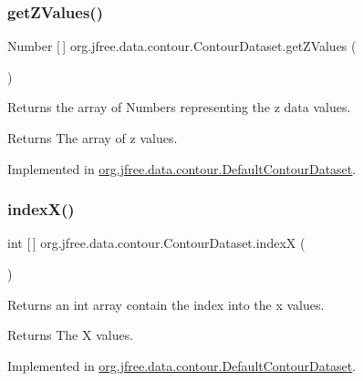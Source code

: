 \subsubsection{\texorpdfstring{get\+Z\+Values()}{getZValues()}}
{\footnotesize\ttfamily Number \mbox{[}$\,$\mbox{]} org.\+jfree.\+data.\+contour.\+Contour\+Dataset.\+get\+Z\+Values (\begin{DoxyParamCaption}{ }\end{DoxyParamCaption})}

Returns the array of Numbers representing the z data values.

\begin{DoxyReturn}{Returns}
The array of z values. 
\end{DoxyReturn}


Implemented in \mbox{\hyperlink{classorg_1_1jfree_1_1data_1_1contour_1_1_default_contour_dataset_aeab7352c99dfe7e6ebff00064e8d7ce0}{org.\+jfree.\+data.\+contour.\+Default\+Contour\+Dataset}}.

\mbox{\label{interfaceorg_1_1jfree_1_1data_1_1contour_1_1_contour_dataset_ae70cc41ec60ec5aea6aae21d9d868b1f}} 
\subsubsection{\texorpdfstring{index\+X()}{indexX()}}
{\footnotesize\ttfamily int \mbox{[}$\,$\mbox{]} org.\+jfree.\+data.\+contour.\+Contour\+Dataset.\+indexX (\begin{DoxyParamCaption}{ }\end{DoxyParamCaption})}

Returns an int array contain the index into the x values.

\begin{DoxyReturn}{Returns}
The X values. 
\end{DoxyReturn}


Implemented in \mbox{\hyperlink{classorg_1_1jfree_1_1data_1_1contour_1_1_default_contour_dataset_ad34ac76cd3de6d536cd7581702c4a2d6}{org.\+jfree.\+data.\+contour.\+Default\+Contour\+Dataset}}.

\mbox{\label{interfaceorg_1_1jfree_1_1data_1_1contour_1_1_contour_dataset_a0a10481379170b70de9a32d422cc6cd3}} 
